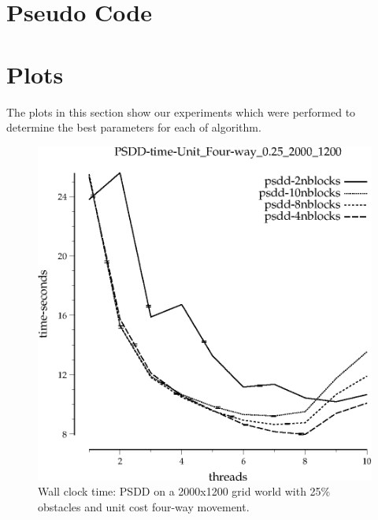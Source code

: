 \documentclass{article}
\begin{document}
\begin{appendices}
\section{Pseudo Code}



\section{Plots}

The plots in this section show our experiments which were performed to
determine the best parameters for each of algorithm.

\begin{figure}[h]
\begin{center}
\includegraphics{../graphs/grid_unit_four-way_0.25_2000_1200/PSDD-time-Unit_Four-way_0.25_2000_1200.eps}
\caption{Wall clock time: PSDD on a 2000x1200 grid world with 25\%
  obstacles and unit cost four-way movement.}
\end{center}
\end{figure}


\end{appendices}
\end{document}
